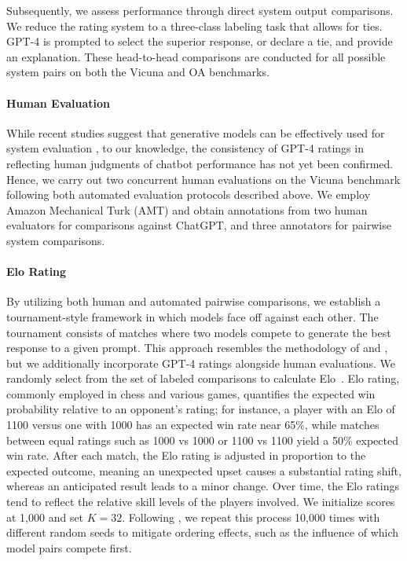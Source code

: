 Subsequently, we assess performance through direct system output comparisons. We reduce the rating system to a three-class labeling task that allows for ties. GPT-4 is prompted to select the superior response, or declare a tie, and provide an explanation. These head-to-head comparisons are conducted for all possible system pairs on both the Vicuna and OA benchmarks.

\paragraph{Human Evaluation} While recent studies suggest that generative models can be effectively used for system evaluation \citep{fu2023gptscore}, to our knowledge, the consistency of GPT-4 ratings in reflecting human judgments of chatbot performance has not yet been confirmed. Hence, we carry out two concurrent human evaluations on the Vicuna benchmark following both automated evaluation protocols described above. We employ Amazon Mechanical Turk (AMT) and obtain annotations from two human evaluators for comparisons against ChatGPT, and three annotators for pairwise system comparisons.

\paragraph{Elo Rating} By utilizing both human and automated pairwise comparisons, we establish a tournament-style framework in which models face off against each other. The tournament consists of matches where two models compete to generate the best response to a given prompt. This approach resembles the methodology of \citet{bai2022training} and \citet{vicuna2023}, but we additionally incorporate GPT-4 ratings alongside human evaluations. We randomly select from the set of labeled comparisons to calculate Elo~\citep{elo1967proposed,elo1978rating}. Elo rating, commonly employed in chess and various games, quantifies the expected win probability relative to an opponent's rating; for instance, a player with an Elo of 1100 versus one with 1000 has an expected win rate near 65\%, while matches between equal ratings such as 1000 vs 1000 or 1100 vs 1100 yield a 50\% expected win rate. After each match, the Elo rating is adjusted in proportion to the expected outcome, meaning an unexpected upset causes a substantial rating shift, whereas an anticipated result leads to a minor change. Over time, the Elo ratings tend to reflect the relative skill levels of the players involved. We initialize scores at 1,000 and set $K=32$. Following \citet{vicuna2023}, we repeat this process 10,000 times with different random seeds to mitigate ordering effects, such as the influence of which model pairs compete first.

